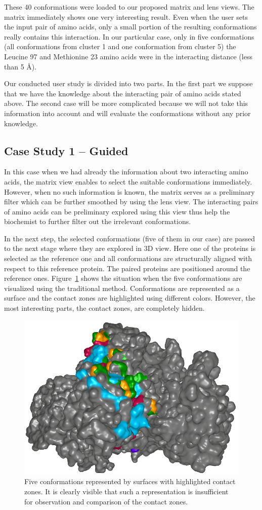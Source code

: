 \documentclass[journal]{vgtc}                %
\begin{document}
These 40 conformations were loaded to our proposed matrix and lens views. 
The matrix immediately shows one very interesting result.
Even when the user sets the input pair of amino acids, only a small portion of the resulting conformations really contains this interaction.
In our particular case, only in five conformations (all conformations from cluster 1 and one conformation from cluster 5) the Leucine 97 and Methionine 23 amino acids were in the interacting distance (less than 5 \AA ).

Our conducted user study is divided into two parts. In the first part we suppose that we have the knowledge about the interacting pair of amino acids stated above.
The second case will be more complicated because we will not take this information into account and will evaluate the conformations without any prior knowledge.

\subsection{Case Study 1 -- Guided}
In this case when we had already the information about two interacting amino acids, the matrix view enables to select the suitable conformations immediately.
However, when no such information is known, the matrix serves as a preliminary filter which can be further smoothed by using the lens view.
The interacting pairs of amino acids can be preliminary explored using this view thus help the biochemist to further filter out the irrelevant conformations.

In the next step, the selected conformations (five of them in our case) are passed to the next stage where they are explored in 3D view.
Here one of the proteins is selected as the reference one and all conformations are structurally aligned with respect to this reference protein.
The paired proteins are positioned around the reference ones.
Figure~\ref{fig:case1} shows the situation when the five conformations are visualized using the traditional method.
Conformations are represented as a surface and the contact zones are highlighted using different colors.
However, the most interesting parts, the contact zones, are completely hidden.

\begin{figure}[bt]
  \centering
  \includegraphics[width=0.7\columnwidth]{case1.png}
  \caption{Five conformations represented by surfaces with highlighted contact zones. It is clearly visible that such a representation is insufficient for observation and comparison of the contact zones.}
  \label{fig:case1}
\end{figure}
\end{document}

